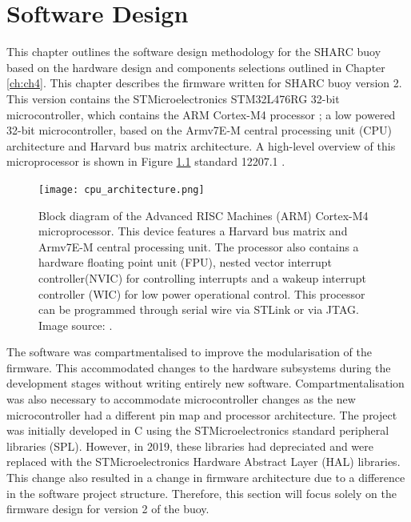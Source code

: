 \chapter{Software Design}
\label{ch:ch5}
This chapter outlines the software design methodology for the SHARC buoy based on the hardware design and components selections outlined in Chapter \ref{ch:ch4}. This chapter describes the firmware written for SHARC buoy version 2. This version contains the STMicroelectronics STM32L476RG 32-bit microcontroller, \cite{stm32l4} which contains the ARM Cortex-M4 processor \cite{ARMprocessor}; a low powered 32-bit microcontroller, based on the Armv7E-M central processing unit (CPU) architecture and Harvard bus matrix architecture. A high-level overview of this microprocessor is shown in Figure \ref{fig:cpu} standard 12207.1 \cite{IEE_STD_SOFTCYCLE}.

\begin{figure}[H]
	\centering
	\texttt{[image: cpu\_architecture.png]}
	\caption{Block diagram of the Advanced RISC Machines (ARM) Cortex-M4 microprocessor. This device features a Harvard bus matrix and  Armv7E-M central processing unit. The processor also contains a hardware floating point unit (FPU), nested vector interrupt controller(NVIC) for controlling interrupts and a wakeup interrupt controller (WIC) for low power operational control. This processor can be programmed through serial wire via STLink or via JTAG. Image source: \cite{ARMprocessor}.  }
	\label{fig:cpu}
\end{figure}

The software was compartmentalised to improve the modularisation of the firmware. This accommodated changes to the hardware subsystems during the development stages without writing entirely new software. Compartmentalisation was also necessary to accommodate microcontroller changes as the new microcontroller had a different pin map and processor architecture. The project was initially developed in C using the STMicroelectronics standard peripheral libraries (SPL). However, in 2019, these libraries had depreciated and were replaced with the STMicroelectronics Hardware Abstract Layer (HAL) libraries. This change also resulted in a change in firmware architecture due to a difference in the software project structure. Therefore,  this section will focus solely on the firmware design for version 2 of the buoy.

